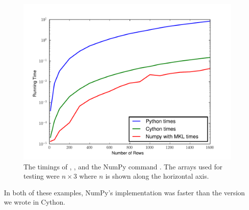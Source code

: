 \begin{figure}
\centering
\includegraphics[width=\textwidth]{rowdot.pdf}
\caption{The timings of , , and the NumPy command .
The arrays used for testing were $n\times 3$ where $n$ is shown along the horizontal axis.}
\label{cython:rowdot}
\end{figure}

In both of these examples, NumPy's implementation was faster than the version we wrote in Cython.












